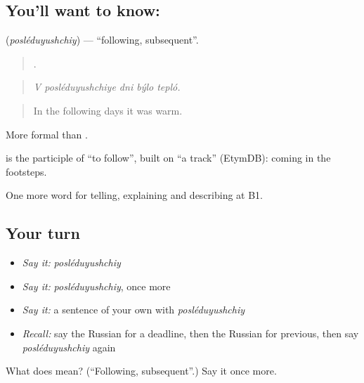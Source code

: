 \subsection*{You'll want to know: }
\textbf{} (\emph{posléduyushchiy}) — \textquotedblleft{}following, subsequent\textquotedblright{}.

\begin{quote}
    .
\end{quote}

\begin{quote}
\emph{V posléduyushchiye dni býlo tepló.}
\end{quote}

\begin{quote}
In the following days it was warm.
\end{quote}

More formal than \emph{}.

\begin{cousinweb}
\emph{} is the participle of \emph{} \textquotedblleft{}to follow\textquotedblright{}, built on \emph{} \textquotedblleft{}a track\textquotedblright{} (EtymDB): coming in the footsteps.
\end{cousinweb}

\begin{grammarlens}[title={What you've built}]
One more word for telling, explaining and describing at B1.
\end{grammarlens}

\subsection*{Your turn}
\begin{itemize}
\raggedright
  \item \emph{Say it:} \emph{posléduyushchiy}
  \item \emph{Say it:} \emph{posléduyushchiy}, once more
  \item \emph{Say it:} a sentence of your own with \emph{posléduyushchiy}
  \item \emph{Recall:} say the Russian for a deadline, then the Russian for previous, then say \emph{posléduyushchiy} again
\end{itemize}

\begin{tcolorbox}[breakable,colback=teal!4,colframe=teal!35!black,title={Before you move on}]
What does  mean? (\textquotedblleft{}Following, subsequent\textquotedblright{}.) Say it once more.
\end{tcolorbox}
